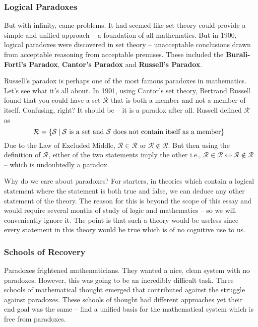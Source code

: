 \documentclass[a4paper, 12pt]{article}
\theoremstyle{definition}
\begin{document}
    \subsubsection*{Logical Paradoxes}
    \vspace{-0.5 em}
    But with infinity, came problems. It had seemed like set theory could provide a simple and unified approach -- a foundation of all mathematics. 
    But in 1900, logical paradoxes were discovered in set theory -- unacceptable conclusions drawn from acceptable reasoning 
    from acceptable premises. These included the \textbf{Burali-Forti's Paradox}, \textbf{Cantor's Paradox} 
    and \textbf{Russell's Paradox}. 

    Russell's paradox is perhaps one of the most famous paradoxes in mathematics. Let's see what it's all about. 
    In 1901, using Cantor's set theory, Bertrand Russell found that you could have a set $\mathcal{R}$ that is both a member and 
    not a member of itself. Confusing, right? It should be -- it is a paradox after all. Russell defined $\mathcal{R}$ as \[
        \mathcal{R} = \{\mathcal{S} \hspace{0.25 em} | \hspace{0.25 em} \mathcal{S} \text{ is a set and $\mathcal{S}$ does not contain itself as a member}\}\]
    Due to the Law of Excluded Middle, $\mathcal{R} \in \mathcal{R}$ or $\mathcal{R} \notin \mathcal{R}$. But then using 
    the definition of $\mathcal{R}$, either of the two statements imply the other i.e., $\mathcal{R} \in \mathcal{R} \iff \mathcal{R} \notin \mathcal{R}$ -- which is 
    undoubtedly a paradox. 

    Why do we care about paradoxes? For starters, in theories which contain a logical statement where the statement is 
    both true and false, we can deduce any other statement of the theory. The reason for this is beyond the scope of this 
    essay and would require several months of study of logic and mathematics -- so we will conveniently ignore it. The point is 
    that such a theory would be useless since every statement in this theory would be true which is of no cognitive use to us. 

    \subsubsection*{Schools of Recovery}
    Paradoxes frightened mathematicians. They wanted a nice, clean system with no paradoxes. However, this was going to be an 
    incredibly difficult task. Three schools of mathematical thought emerged that contributed against the struggle against paradoxes. 
    These schools of thought had different approaches yet their end goal was the same -- find a unified basis for the mathematical system which is 
    free from paradoxes. 
\end{document}
